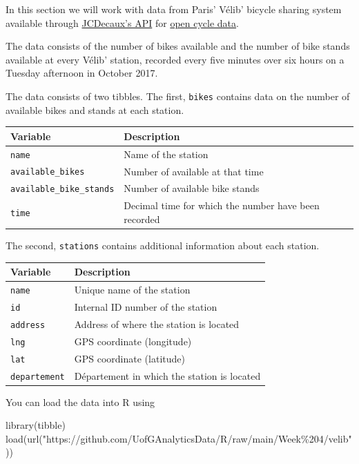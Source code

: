 \documentclass[
]{book}
\newenvironment{Shaded}{\begin{snugshade}}{\end{snugshade}}
\newcommand{\FunctionTok}[1]{\textcolor[rgb]{0.00,0.00,0.00}{#1}}
\newcommand{\NormalTok}[1]{#1}
\newcommand{\StringTok}[1]{\textcolor[rgb]{0.31,0.60,0.02}{#1}}
\begin{document}
In this section we will work with data from Paris' Vélib' bicycle sharing system available through \href{https://developer.jcdecaux.com/}{JCDecaux's API} for \href{https://developer.jcdecaux.com/\#/opendata/}{open cycle data}.

The data consists of the number of bikes available and the number of bike stands available at every Vélib' station, recorded every five minutes over six hours on a Tuesday afternoon in October 2017.

The data consists of two tibbles. The first, \texttt{bikes} contains data on the number of available bikes and stands at each station.

\begin{longtable}[]{@{}ll@{}}
\toprule()
Variable & Description \\
\midrule()
\endhead
\texttt{name} & Name of the station \\
\texttt{available\_bikes} & Number of available at that time \\
\texttt{available\_bike\_stands} & Number of available bike stands \\
\texttt{time} & Decimal time for which the number have been recorded \\
\bottomrule()
\end{longtable}

The second, \texttt{stations} contains additional information about each station.

\begin{longtable}[]{@{}ll@{}}
\toprule()
Variable & Description \\
\midrule()
\endhead
\texttt{name} & Unique name of the station \\
\texttt{id} & Internal ID number of the station \\
\texttt{address} & Address of where the station is located \\
\texttt{lng} & GPS coordinate (longitude) \\
\texttt{lat} & GPS coordinate (latitude) \\
\texttt{departement} & Département in which the station is located \\
\bottomrule()
\end{longtable}

You can load the data into R using

\begin{Shaded}
\begin{Highlighting}[]
\FunctionTok{library}\NormalTok{(tibble)}
\FunctionTok{load}\NormalTok{(}\FunctionTok{url}\NormalTok{(}\StringTok{"https://github.com/UofGAnalyticsData/R/raw/main/Week\%204/velib"}\NormalTok{))}
\end{Highlighting}
\end{Shaded}
\end{document}
